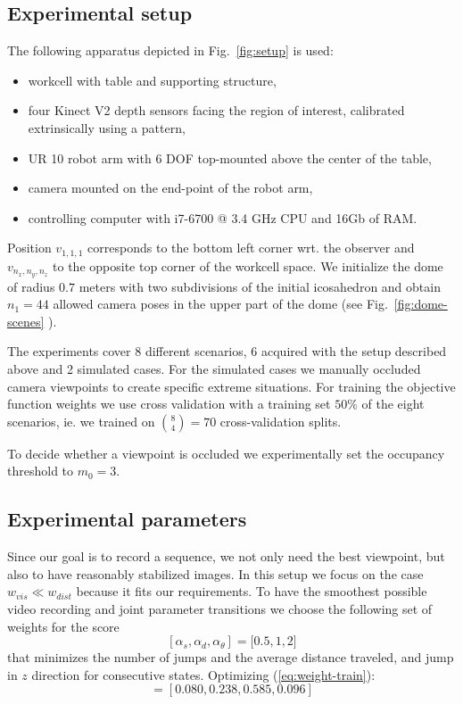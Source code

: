 \documentclass[10pt,twocolumn,letterpaper]{article}
\begin{document}
\subsection{Experimental setup}
The following apparatus depicted in Fig.~\ref{fig:setup} is used:
\begin{itemize}
  \item workcell with table and supporting structure,
  \item four Kinect V2 depth sensors facing the region of interest, calibrated extrinsically using a pattern,
  \item UR 10 robot arm with 6 DOF top-mounted above the center of the table, 
  \item camera mounted on the end-point of the robot arm,
  \item controlling computer with i7-6700 @ 3.4 GHz CPU and 16Gb of RAM.
\end{itemize}

Position $v_{1,1,1}$ corresponds to the bottom left corner wrt. the observer and  $v_{n_{x},n_{y},n_{z}}$ to the opposite top corner of the workcell space.  
 We initialize the dome of radius $0.7$ meters with two subdivisions of the initial icosahedron and obtain $n_1=44$ allowed camera poses in the upper part of the dome 
(see Fig.~\ref{fig:dome-scenes} ).

The experiments cover 8 different scenarios, 6 acquired with the setup described above and 2 simulated cases. 
For the simulated cases we manually occluded camera viewpoints to create specific extreme situations.
For training the objective function weights we use cross validation with a training set $50\%$ of the eight scenarios, ie. we trained on ${{8}\choose{4}}=70$ cross-validation splits. 

To decide whether a viewpoint is occluded we experimentally set the occupancy threshold to $m_{0}=3$. 

\subsection{Experimental parameters}\label{sec:exp-params}

Since our goal is to record a sequence, we not only need the best viewpoint, but also to have reasonably stabilized images. 
In this setup we focus on the case $w_{vis} \ll w_{dist}$ because it fits our requirements. 
To have the smoothest possible video recording and joint parameter transitions we choose the following set of weights for the score
\begin{equation}\label{eq:final-weights}
[\alpha_{s},\alpha_{d}, \alpha_{\theta}]=\big[ 0.5, 1, 2 \big]
\end{equation}
that minimizes the number of jumps and the average distance traveled, and jump in $z$ direction for consecutive states. 
Optimizing  (\ref{eq:weight-train}):
\begin{equation}
[w_{nocc},w_{vis},w_{dist},w_{jt}]=[0.080, 0.238, 0.585, 0.096]
\end{equation}
 
\end{document}
